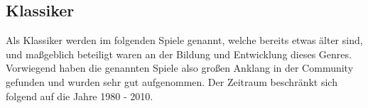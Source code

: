 \subsection{Klassiker}
Als Klassiker werden im folgenden Spiele genannt, welche bereits etwas älter sind, und maßgeblich beteiligt waren an der Bildung und Entwicklung dieses Genres. Vorwiegend haben die genannten Spiele also großen Anklang in der Community gefunden und wurden sehr gut aufgenommen. Der Zeitraum beschränkt sich folgend auf die Jahre 1980 - 2010.


